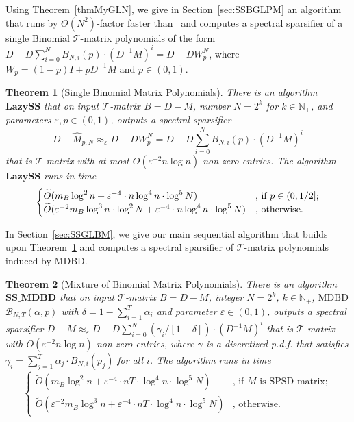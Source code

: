 \documentclass[11pt]{article}
\newcommand{\SPSD}{\mathrm{SPSD}}
\newcommand{\MDBD}{\mathrm{MDBD}}
\newcommand{\GL}{\mathcal{T}}
\newcommand{\BNTap}{\mathcal{B}_{N,T}(\alpha,p)}
\newcommand{\SSMDBD}{\mathrm{\mathbf{SS\_MDBD}}}
\newcommand{\wO}{\widetilde{O}}
\newcommand{\hM}{\widehat{M}}
\newcommand{\Di}{D^{-1}}
\newcommand{\N}{\mathbb{N}}
\newcommand{\eps}{\epsilon}
\renewcommand{\eps}{\varepsilon}
\newtheorem{thm}{Theorem}  \newtheorem{fact}[thm]{Fact}
\numberwithin{thm}{section}
\begin{document}
Using Theorem~\ref{thmMyGLN}, we give in Section~\ref{sec:SSBGLPM} an algorithm
that runs by $\Theta(N^2)$-factor faster than~\cite[Theorem 2]{CCLPT15} and computes a spectral sparsifier of a single Binomial $\GL$-matrix polynomials of the form $D-D\sum_{i=0}^{N}B_{N,i}(p)\cdot(\Di M)^{i}=D-DW_{p}^{N}$, where $W_{p}=(1-p)I+p\Di M$ and $p\in(0,1)$.

\begin{thm}[Single Binomial Matrix Polynomials]\label{thm_LazySS}
There is an algorithm $\mathrm{\mathbf{LazySS}}$
that on input $\GL$-matrix $B=D-M$, number $N=2^{k}$
for $k\in\N_+$, and parameters $\eps,p\in(0,1)$, outputs a spectral sparsifier
\[
D-\hM_{p,N} \approx_{\eps} D-DW_{p}^{N}=D - D\sum_{i=0}^{N} B_{N,i}(p) \cdot(\Di M)^{i}
\]
that is $\GL$-matrix with at most $O(\eps^{-2}n\log n)$ non-zero entries. The algorithm $\mathrm{\mathbf{LazySS}}$ runs in time
\[
\begin{cases}
\wO(m_{B}\log^{2}n+\eps^{-4}\cdot n\log^{4}n\cdot\log^{5}N) & \text{, if \ensuremath{p\in(0,1/2]}};\\
\wO(\eps^{-2}m_{B}\log^{3}n\cdot\log^{2}N+\eps^{-4}\cdot n\log^{4}n\cdot\log^{5}N) & \text{, otherwise.}
\end{cases}
\]
\end{thm}


In Section~\ref{sec:SSGLBM}, we give our main sequential algorithm that builds upon Theorem~\ref{thm_LazySS} and computes a spectral sparsifier of $\GL$-matrix polynomials induced by $\MDBD$.

\begin{thm}[Mixture of Binomial Matrix Polynomials]\label{thm_SS_MGL}
There is an algorithm $\SSMDBD$ that on input $\GL$-matrix $B=D-M$, integer $N=2^{k}$, $k\in\N_+$, $\MDBD$ $\BNTap$ with $\delta=1-\sum_{i=1}^{T}\alpha_i$ and parameter $\eps\in(0,1)$, outputs a spectral sparsifier $D-\hM \approx_{\eps}D-D\sum_{i=0}^{N}(\gamma_{i}/[1-\delta])\cdot(\Di M)^{i}$ that is $\GL$-matrix with $O(\eps^{-2}n\log n)$ non-zero entries, where $\gamma$ is a discretized p.d.f. that satisfies $\gamma_{i}=\sum_{j=1}^{T}\alpha_{j}\cdot B_{N,i}(p_{j})$ for all $i$. The algorithm runs in time
\[
\begin{cases}
\wO(m_B\log^{2}n + \eps^{-4}\cdot nT\cdot\log^{4}n\cdot\log^{5}N) & \text{, if $M$ is $\SPSD$ matrix};\\
\wO(\eps^{-2}m_B\log^{3}n + \eps^{-4}\cdot nT\cdot\log^{4}n\cdot\log^{5}N) & \text{, otherwise.}
\end{cases}
\]
\end{thm}
\end{document}
